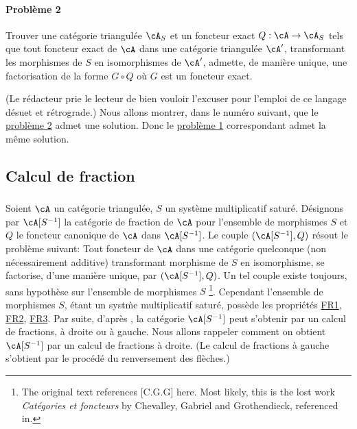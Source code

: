 \paragraph{Problème 2}
\hypertarget{VIII:prob2}{}
Trouver une catégorie triangulée $\cA_S$ et un foncteur exact 
$Q:\cA\to \cA_S$ tels que tout foncteur exact de $\cA$ dans une catégorie 
triangulée $\cA'$, transformant les morphismes de $S$ en isomorphismes de 
$\cA'$, admette, de manière unique, une factorisation de la forme 
$G\circ Q$ où $G$ est un foncteur exact. 

(Le rédacteur prie le lecteur de bien vouloir l'excuser pour l'emploi de ce 
langage désuet et rétrograde.) Nous allons montrer, dans le numéro 
suivant, que le \hyperlink{VIII:prob2}{problème 2} admet une solution. Donc 
le \hyperlink{VIII:prob1}{problème 1} correspondant admet la même solution. 










\subsection{Calcul de fraction}\label{VIII:2-3}





\subsubsection{}\label{VIII:2-3-1}

Soient $\cA$ un catégorie triangulée, $S$ un système multiplicatif 
saturé. Désignons par $\cA[S^{-1}]$ la catégorie de fraction de $\cA$ 
pour l'ensemble de morphismes $S$ et $Q$ le foncteur canonique de $\cA$ dans 
$\cA[S^{-1}]$. Le couple $(\cA[S^{-1}],Q)$ résout le problème suivant: Tout 
foncteur de $\cA$ dans une catégorie quelconque (non nécessairement 
additive) transformant morphisme de $S$ en isomorphisme, se factorise, d'une 
manière unique, par $(\cA[S^{-1}],Q)$. Un tel couple existe toujours, sans 
hypothèse sur l'ensemble de morphismes $S$ \cite[1.1]{gz67}\footnote{The 
original text references [C.G.G] here. Most likely, this is the lost work 
\emph{Catégories et foncteurs} by Chevalley, Gabriel and Grothendieck, 
referenced in\cite{sc72}. }. Cependant l'ensemble 
de morphismes $S$, étant un syst\`me multiplicatif saturé, possède les 
propriétés \hyperlink{VIII:FR1}{FR1}, \hyperlink{VIII:FR2}{FR2}, 
\hyperlink{VIII:FR3}{FR3}. Par suite, d'après \cite{gz67}, la catégorie 
$\cA[S^{-1}]$ peut s'obtenir par un calcul de fractions, à droite ou à 
gauche. Nous allons rappeler comment on obtient $\cA[S^{-1}]$ par un calcul de 
fractions à droite. (Le calcul de fractions à gauche s'obtient par le 
procédé du renversement des flèches.) 





